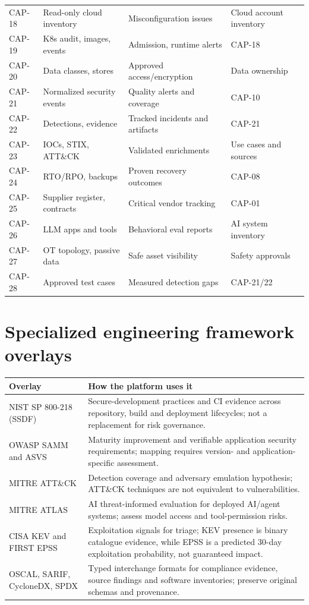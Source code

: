 \documentclass[11pt,oneside]{report}
\begin{document}
\begin{longtable}{P{0.10\textwidth}P{0.26\textwidth}P{0.27\textwidth}P{0.25\textwidth}}
CAP-18 & Read-only cloud inventory & Misconfiguration issues & Cloud account inventory \\
CAP-19 & K8s audit, images, events & Admission, runtime alerts & CAP-18 \\
CAP-20 & Data classes, stores & Approved access/encryption & Data ownership \\
CAP-21 & Normalized security events & Quality alerts and coverage & CAP-10 \\
CAP-22 & Detections, evidence & Tracked incidents and artifacts & CAP-21 \\
CAP-23 & IOCs, STIX, ATT\&CK & Validated enrichments & Use cases and sources \\
CAP-24 & RTO/RPO, backups & Proven recovery outcomes & CAP-08 \\
CAP-25 & Supplier register, contracts & Critical vendor tracking & CAP-01 \\
CAP-26 & LLM apps and tools & Behavioral eval reports & AI system inventory \\
CAP-27 & OT topology, passive data & Safe asset visibility & Safety approvals \\
CAP-28 & Approved test cases & Measured detection gaps & CAP-21/22 \\
\bottomrule\end{longtable}\normalsize
\section{Specialized engineering framework overlays}

\noindent\begin{tabularx}{\textwidth}{P{0.28\textwidth}Y}
\toprule Overlay & How the platform uses it\\\midrule
NIST SP 800-218 (SSDF) & Secure-development practices and CI evidence across repository, build and deployment lifecycles; not a replacement for risk governance.\\
OWASP SAMM and ASVS & Maturity improvement and verifiable application security requirements; mapping requires version- and application-specific assessment.\\
MITRE ATT\&CK & Detection coverage and adversary emulation hypothesis; ATT\&CK techniques are not equivalent to vulnerabilities.\\
MITRE ATLAS & AI threat-informed evaluation for deployed AI/agent systems; assess model access and tool-permission risks.\\
CISA KEV and FIRST EPSS & Exploitation signals for triage; KEV presence is binary catalogue evidence, while EPSS is a predicted 30-day exploitation probability, not guaranteed impact.\\
OSCAL, SARIF, CycloneDX, SPDX & Typed interchange formats for compliance evidence, source findings and software inventories; preserve original schemas and provenance.\\
\bottomrule
\end{tabularx}
\end{document}
